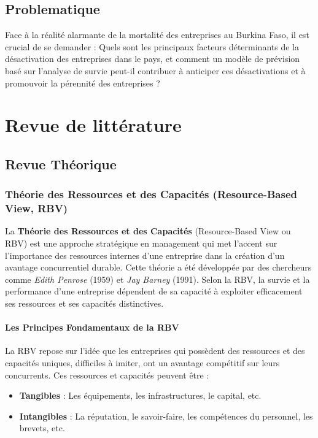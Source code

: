 \documentclass[a4paper,12pt]{report}
\begin{document}
\section{Problematique}

Face à la réalité alarmante de la mortalité des entreprises au Burkina Faso, il est crucial de se demander : Quels sont les principaux facteurs déterminants de la désactivation des entreprises dans le pays, et comment un modèle de prévision basé sur l'analyse de survie peut-il contribuer à anticiper ces désactivations et à promouvoir la pérennité des entreprises ?

\chapter{Revue de littérature}
\setcounter{section}{0}
\section{Revue Théorique}
\subsection{Théorie des Ressources et des Capacités (Resource-Based View, RBV)}

La \textbf{Théorie des Ressources et des Capacités} (Resource-Based View ou RBV) est une approche stratégique en management qui met l'accent sur l'importance des ressources internes d'une entreprise dans la création d'un avantage concurrentiel durable. Cette théorie a été développée par des chercheurs comme \textit{Edith Penrose} (1959) et \textit{Jay Barney} (1991). Selon la RBV, la survie et la performance d'une entreprise dépendent de sa capacité à exploiter efficacement ses ressources et ses capacités distinctives.

\subsubsection{Les Principes Fondamentaux de la RBV}
La RBV repose sur l'idée que les entreprises qui possèdent des ressources et des capacités uniques, difficiles à imiter, ont un avantage compétitif sur leurs concurrents. Ces ressources et capacités peuvent être :
\begin{itemize}
    \item \textbf{Tangibles} : Les équipements, les infrastructures, le capital, etc.
    \item \textbf{Intangibles} : La réputation, le savoir-faire, les compétences du personnel, les brevets, etc.
\end{itemize}
\end{document}
